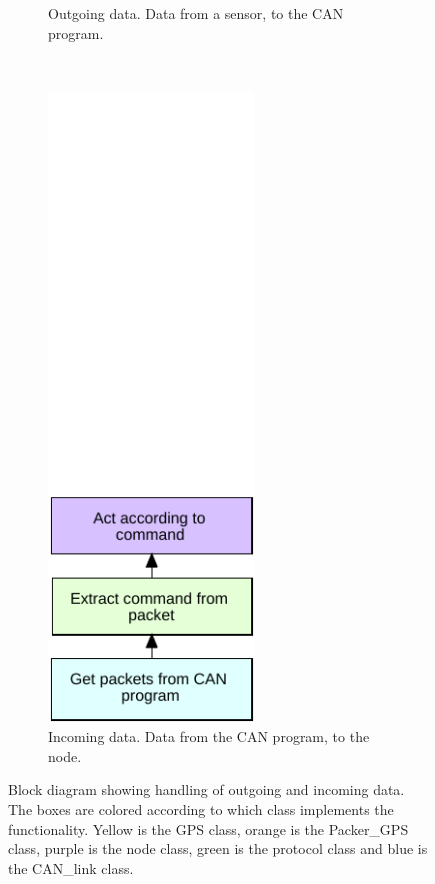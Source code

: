 \begin{figure}[!h]
\begin{subfigure}{0.45\textwidth}
\caption{Outgoing data. Data from a sensor, to the CAN program.}
\label{fig:filter_1}
\end{subfigure}
~
\begin{subfigure}{0.45\textwidth}
\centering
\includegraphics[width=0.60\textwidth]{graphics/FlowChart_Node_Unpacking}
\caption{Incoming data. Data from the CAN program, to the node.}
\label{fig:filter_2}
\end{subfigure}
\caption{Block diagram showing handling of outgoing and incoming data. The boxes are colored according to which class implements the functionality. 
Yellow is the GPS class, orange is the Packer\_GPS class, purple is the node class, green is the protocol class and blue is the CAN\_link class.}
\label{fig:flow_flow}
\end{figure}

